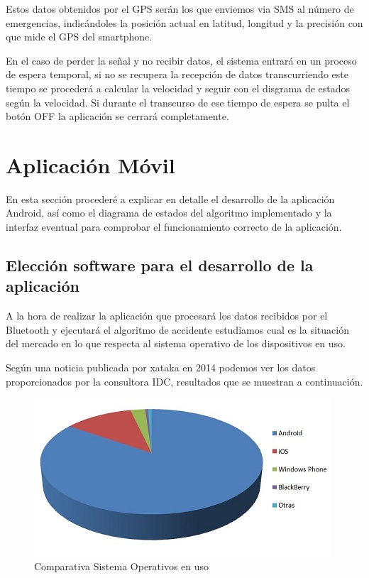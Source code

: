 		Estos datos obtenidos por el GPS serán los que enviemos via SMS al número de emergencias, indicándoles la posición actual en latitud, longitud y la precisión con que mide el GPS del smartphone.
		
		En el caso de perder la se\~nal y no recibir datos, el sistema entrará en un proceso de espera temporal, si no se recupera la recepción de datos transcurriendo este tiempo se procederá a calcular la velocidad y seguir con el disgrama de estados según la velocidad. Si durante el transcurso de ese tiempo de espera se pulta el botón OFF la aplicación se cerrará completamente.
	
		
	\section{Aplicación Móvil}
	
		En esta sección procederé a explicar en detalle el desarrollo de la aplicación Android, así como el diagrama de estados del algoritmo implementado y la interfaz eventual para comprobar el funcionamiento correcto de la aplicación.
		
		\subsection{Elección software para el desarrollo de la aplicación}
			
			A la hora de realizar la aplicación que procesará los datos recibidos por el Bluetooth y ejecutará el algoritmo de accidente estudiamos cual es la situación del mercado en lo que respecta al sistema operativo de los dispositivos en uso. 
			
			Según una noticia publicada por xataka en 2014 \cite{AndroidVsiOS} podemos ver los datos proporcionados por la consultora IDC, resultados que se muestran a continuación.
			
			\begin{figure}[h]
				\centering
				\includegraphics{imagenes/ArduinoVsiOS.jpg}
				\caption{Comparativa Sistema Operativos en uso}
				\label{contexto:figura}
			\end{figure}
			
